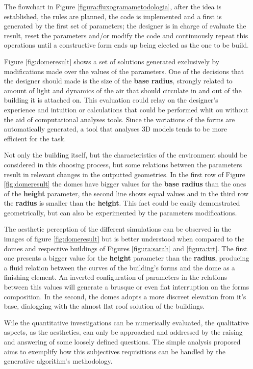 \documentclass[preprint,12pt,3p]{elsarticle}
\begin{document}
The flowchart in Figure \ref{figura:fluxogramametodologia}, after the idea is established, the rules are planned, the code is implemented and a first is generated by the first set of parameters; the designer is in charge of evaluate the result, reset the parameters and/or modify the code and continuously repeat this operations until a constructive form ends up being elected as the one to be build.

Figure \ref{fig:domeresult} shows a set of solutions generated exclusively by modifications made over the values of the parameters. One of the decisions that the designer should made is the size of the \textbf{base radius}, strongly related to amount of light and dynamics of the air that should circulate in and out of the building it is attached on. This evaluation could relay on the designer's experience and intuition or calculations that could be performed whit ou without the aid of computational analyses tools. Since the variations of the forms are automatically generated, a tool that analyses 3D models tends to be more efficient for the task.

Not only the building itself, but the characteristics of the environment should be considered in this choosing process, but some relations between the parameters result in relevant changes in the outputted geometries. In the first row of Figure \ref{fig:domeresult} the domes have bigger values for the \textbf{base radius} than the ones of the \textbf{height} parameter, the second line shows equal values and in the third row the \textbf{radius} is smaller than the \textbf{height}. This fact could be easily demonstrated geometrically, but can also be experimented by the parameters modifications. 

The aesthetic perception of the different simulations can be observed in the images of figure \ref{fig:domeresult} but is better understood when compared to the domes and respective buildings of Figures \ref{figura:sarah} and \ref{figura:trt}. The first one presents a bigger value for the \textbf{height} parameter than the \textbf{radius}, producing a fluid relation between the curves of the building's forms and the dome as a finishing element. An inverted configuration of parameters in the relations between this values will generate a brusque or even flat interruption on the forms composition. In the second, the domes adopts a more discreet elevation from it's base, dialogging with the almost flat roof solution of the buildings.

Wile the quantitative investigations can be numerically evaluated, the qualitative aspects, as the aesthetics, can only be approached and addressed by the raising and answering of some loosely defined questions. The simple analysis proposed aims to exemplify how this subjectives requisitions can be handled by the generative algorithm's methodology.
\end{document}
